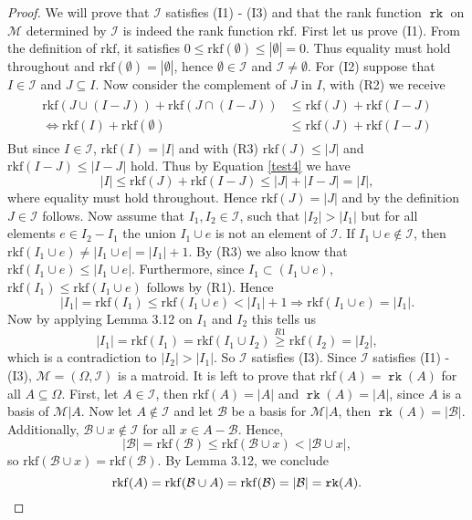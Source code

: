 \documentclass[12pt,a4paper, twoside, autooneside=false]{scrartcl}
\theoremstyle{definition}
\theoremstyle{remark}
\numberwithin{equation}{section}
\DeclareMathOperator{\rk}{\mathtt{rk}}
\newcommand{\M}{\mathcal{M}} %
\begin{document}
\begin{proof}
We will prove that $\mathcal{I}$ satisfies (I1) - (I3) and that the rank function $\rk$ on $\M$ determined by $\mathcal{I}$ is indeed the rank function $\mathrm{rkf}$. First let us prove (I1). From the definition of $\mathrm{rkf}$, it satisfies $0 \leq \mathrm{rkf}(\emptyset) \leq |\emptyset| = 0$. Thus equality must hold throughout and $\mathrm{rkf}(\emptyset) = |\emptyset|$, hence $\emptyset \in \mathcal{I}$ and $\mathcal{I} \neq \emptyset$. For (I2) suppose that $I \in \mathcal{I}$ and $J \subseteq I$. Now consider the complement of $J$ in $I$, with (R2) we receive
\begin{align}\label{test4}
\begin{split}
\mathrm{rkf}(J \cup (I - J)) + \mathrm{rkf}(J \cap (I - J)) &\leq \mathrm{rkf}(J) + \mathrm{rkf}(I - J) \\ \Longleftrightarrow \mathrm{rkf}(I) + \mathrm{rkf}(\emptyset) &\leq \mathrm{rkf}(J) + \mathrm{rkf}(I - J)
\end{split}
\end{align}
But since $I \in \mathcal{I}$, $\mathrm{rkf}(I) = |I|$ and with (R3) $\mathrm{rkf}(J) \leq |J|$ and $\mathrm{rkf}(I - J) \leq |I - J|$ hold. Thus by Equation \eqref{test4} we have
\[
|I| \leq \mathrm{rkf}(J) + \mathrm{rkf}(I - J) \leq |J| + |I - J| = |I|,
\]
where equality must hold throughout. Hence $\mathrm{rkf}(J) = |J|$ and by the definition $J \in \mathcal{I}$ follows. Now assume that $I_1, I_2 \in \mathcal{I}$, such that $|I_2| > |I_1|$ but for all elements $e \in I_2 - I_1$ the union $I_1 \cup e$ is not an element of $\mathcal{I}$. If $I_1 \cup e \not \in \mathcal{I}$, then $\mathrm{rkf}(I_1 \cup e) \neq |I_1 \cup e| = |I_1| + 1$. By (R3) we also know that $\mathrm{rkf}(I_1 \cup e) \leq |I_1 \cup e|$. Furthermore, since $I_1 \subset (I_1 \cup e)$, $\mathrm{rkf}(I_1) \leq \mathrm{rkf}(I_1 \cup e)$ follows by (R1). Hence 
\[
|I_1| = \mathrm{rkf}(I_1) \leq \mathrm{rkf}(I_1 \cup e) < |I_1| + 1 \Longrightarrow \mathrm{rkf}(I_1 \cup e) = |I_1|.
\] 
Now by applying Lemma 3.12 on $I_1$ and $I_2$ this tells us 
\[
|I_1| = \mathrm{rkf}(I_1) = \mathrm{rkf}(I_1 \cup I_2) \overset{R1}{\geq} \mathrm{rkf}(I_2) = |I_2|,
\]
which is a contradiction to $|I_2| > |I_1|$. So $\mathcal{I}$ satisfies (I3). Since $\mathcal{I}$ satisfies (I1) - (I3), $\M = (\Omega, \mathcal{I})$ is a matroid. It is left to prove that $\mathrm{rkf}(A) = \rk(A)$ for all $A \subseteq \Omega$.  First, let $A \in \mathcal{I}$, then $\mathrm{rkf}(A) = |A|$ and $\rk(A) = |A|$, since $A$ is a basis of $\M |A$. Now let $A \not \in \mathcal{I}$ and let $\mathcal{B}$ be a basis for $\M |A$, then $\rk(A) = |\mathcal{B}|$. Additionally, $\mathcal{B} \cup x \not \in \mathcal{I}$ for all $x \in A - \mathcal{B}$. Hence, 
\[
|\mathcal{B}| = \mathrm{rkf}(\mathcal{B}) \leq \mathrm{rkf}(\mathcal{B} \cup x) < |\mathcal{B} \cup x|,
\]
so $\mathrm{rkf}(\mathcal{B} \cup x) = \mathrm{rkf}(\mathcal{B})$. By Lemma 3.12, we conclude 
\[
\mathrm{rkf}(A) = \mathrm{rkf}(\mathcal{B} \cup A) = \mathrm{rkf}(\mathcal{B}) = |\mathcal{B}| = \rk(A). \qedhere
\]
\end{proof}
\end{document}
